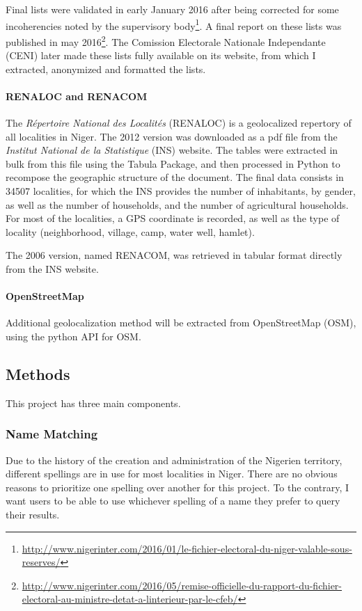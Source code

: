 Final lists were validated in early January 2016 after being corrected for some incoherencies noted by the supervisory body\footnote{\url{http://www.nigerinter.com/2016/01/le-fichier-electoral-du-niger-valable-sous-reserves/}}.
A final report on these lists was published in may 2016\footnote{\url{http://www.nigerinter.com/2016/05/remise-officielle-du-rapport-du-fichier-electoral-au-ministre-detat-a-linterieur-par-le-cfeb/}}.
The Comission Electorale Nationale Independante (CENI) later made these lists fully available on its website, from which I extracted, anonymized and formatted the lists.

\paragraph{RENALOC and RENACOM} The \textit{Répertoire National des Localités} (RENALOC) is a geolocalized repertory of all localities in Niger.  The 2012 version was downloaded as a pdf file from the \textit{Institut National de la Statistique} (INS) website. The tables were extracted in bulk from this file using the Tabula Package, and then processed in Python to recompose the geographic structure of the document. The final data consists in 34507 localities, for which the INS provides the number of inhabitants, by gender, as well as the number of households, and the number of agricultural households. For most of the localities, a GPS coordinate is recorded, as well as the type of locality (neighborhood, village, camp, water well, hamlet).

The 2006 version, named RENACOM, was retrieved in tabular format directly from the INS website.

\paragraph{OpenStreetMap} Additional geolocalization method will be extracted from OpenStreetMap (OSM), using the python API for OSM.

\subsection{Methods}

This project has three main components.

\subsubsection{Name Matching}

Due to the history of the creation and administration of the Nigerien territory, different spellings are in use for most localities in Niger. There are no obvious reasons to prioritize one spelling over another for this project. To the contrary, I want users to be able to use whichever spelling of a name they prefer to query their results.

